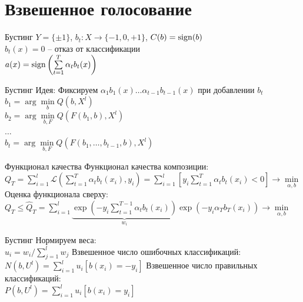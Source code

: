 \documentclass[10pt]{beamer}
\begin{document}
\section{Взвешенное голосование}

{
\begin{frame}{Бустинг}
  $Y = \{\pm 1\}$, \qquad $b_t: X\rightarrow \{-1, 0, +1\}$, \qquad $C(b) = \operatorname{sign}(b)$\\
  $b_t(x) = 0$ -- отказ от классификации\\
  \bigbreak
  \pause
  $a(x) = \operatorname{sign}\left(\sum\limits_{t=1}^{T} \alpha_t b_t(x)\right)$\\
  \bigbreak
\end{frame}
}

{
\begin{frame}{Бустинг}
  \alert{Идея}: Фиксируем $\alpha_1 b_1(x) \dots \alpha_{t-1} b_{t-1}(x)$ при добавлении $b_t$
  \bigbreak
  \pause
  $b_1 = \arg\min\limits_{b} Q(b, X^l)$\\
  $b_2 = \arg\min\limits_{b, F} Q(F(b_1, b), X^l)$\\
  $\dots$\\
  $b_t = \arg\min\limits_{b, F} Q(F(b_1, \dots, b_{t-1}, b), X^l)$
\end{frame}
}

\begin{frame}{Функционал качества}  
  Функционал качества композиции:\\
  $Q_T = \sum\limits_{i=1}^l \mathcal{L}(\sum\limits_{t=1}^{T} \alpha_t b_t(x_i), y_i)  = 
  \sum\limits_{i=1}^l \left[ y_i \sum\limits_{t=1}^{T} \alpha_t b_t(x_i) < 0 \right] \rightarrow \min\limits_{\alpha, b}$
  \bigbreak
  \pause
  Оценка функционала сверху:\\
  $Q_T \leq \hat{Q}_T = \sum\limits_{i=1}^l \underbrace{ \exp \left( -y_i \sum\limits_{t=1}^{T-1} \alpha_t b_t(x_i) \right) }_{w_i} \exp(-y_i \alpha_T b_T(x_i))\rightarrow \min\limits_{\alpha, b}$\\
\end{frame}

\begin{frame}{Бустинг}  
  Нормируем веса:\\
  $u_i = w_i / \sum\limits_{j=1}^l w_j$
  \bigbreak
  Взвешенное число ошибочных классификаций:\\
  $N(b, U^l) = \sum\limits_{i=1}^l u_i [b(x_i) = -y_i]$
  \bigbreak
  Взвешенное число правильных классификаций:\\
  $P(b, U^l) = \sum\limits_{i=1}^l u_i [b(x_i) = y_i]$
\end{frame}
\end{document}
